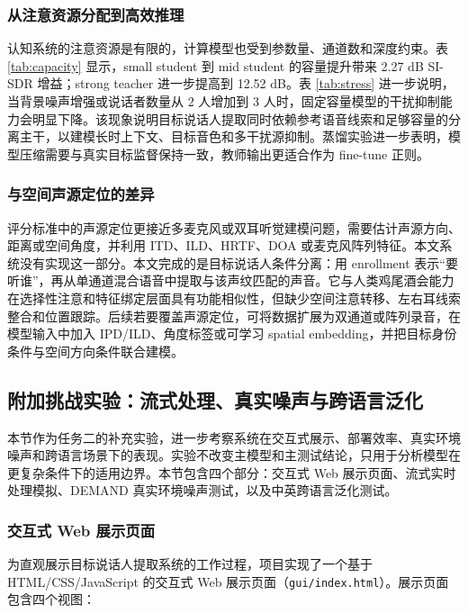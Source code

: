 \documentclass[UTF8,zihao=5,a4paper]{ctexart}
\newcommand{\sisdr}{SI-SDR}
\begin{document}
\subsubsection{从注意资源分配到高效推理}

认知系统的注意资源是有限的，计算模型也受到参数量、通道数和深度约束。表 \ref{tab:capacity} 显示，small student 到 mid student 的容量提升带来 2.27 dB \sisdr{} 增益；strong teacher 进一步提高到 12.52 dB。表 \ref{tab:stress} 进一步说明，当背景噪声增强或说话者数量从 2 人增加到 3 人时，固定容量模型的干扰抑制能力会明显下降。该现象说明目标说话人提取同时依赖参考语音线索和足够容量的分离主干，以建模长时上下文、目标音色和多干扰源抑制。蒸馏实验进一步表明，模型压缩需要与真实目标监督保持一致，教师输出更适合作为 fine-tune 正则。

\subsubsection{与空间声源定位的差异}

评分标准中的声源定位更接近多麦克风或双耳听觉建模问题，需要估计声源方向、距离或空间角度，并利用 ITD、ILD、HRTF、DOA 或麦克风阵列特征。本文系统没有实现这一部分。本文完成的是目标说话人条件分离：用 enrollment 表示“要听谁”，再从单通道混合语音中提取与该声纹匹配的声音。它与人类鸡尾酒会能力在选择性注意和特征绑定层面具有功能相似性，但缺少空间注意转移、左右耳线索整合和位置跟踪。后续若要覆盖声源定位，可将数据扩展为双通道或阵列录音，在模型输入中加入 IPD/ILD、角度标签或可学习 spatial embedding，并把目标身份条件与空间方向条件联合建模。

\subsection{附加挑战实验：流式处理、真实噪声与跨语言泛化}

本节作为任务二的补充实验，进一步考察系统在交互式展示、部署效率、真实环境噪声和跨语言场景下的表现。实验不改变主模型和主测试结论，只用于分析模型在更复杂条件下的适用边界。本节包含四个部分：交互式 Web 展示页面、流式实时处理模拟、DEMAND 真实环境噪声测试，以及中英跨语言泛化测试。

\subsubsection{交互式 Web 展示页面}

为直观展示目标说话人提取系统的工作过程，项目实现了一个基于 HTML/CSS/JavaScript 的交互式 Web 展示页面（\texttt{gui/index.html}）。展示页面包含四个视图：
\end{document}
